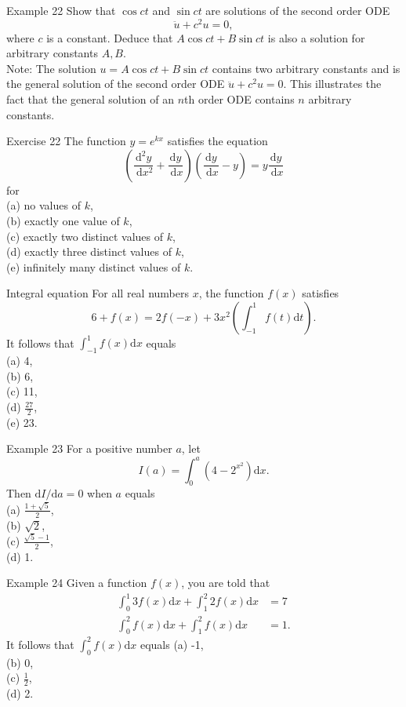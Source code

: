 \documentclass{beamer}
\begin{document}
\begin{frame}{Example 22}
Show that $\cos c t$ and $\sin c t$ are solutions of the second order ODE
$$
\ddot{u}+c^2 u=0,
$$
where $c$ is a constant.
Deduce that $A \cos c t+B \sin c t$ is also a solution for arbitrary constants $A, B$.\\
Note: The solution $u=A \cos c t+B \sin c t$ contains two arbitrary constants and is the general solution of the second order ODE $\ddot{u}+c^2 u=0$. This illustrates the fact that the general solution of an $n$th order ODE contains $n$ arbitrary constants.
\end{frame}

\begin{frame}{Exercise 22}
The function $y=e^{k x}$ satisfies the equation
$$
\left(\frac{\mathrm{d}^2 y}{\mathrm{~d} x^2}+\frac{\mathrm{d} y}{\mathrm{~d} x}\right)\left(\frac{\mathrm{d} y}{\mathrm{~d} x}-y\right)=y \frac{\mathrm{d} y}{\mathrm{~d} x}
$$
for\\
(a) no values of $k$,\\
(b) exactly one value of $k$,\\
(c) exactly two distinct values of $k$,\\
(d) exactly three distinct values of $k$,\\
(e) infinitely many distinct values of $k$.
\end{frame}

\begin{frame}{Integral equation}
For all real numbers $x$, the function $f(x)$ satisfies
$$
6+f(x)=2 f(-x)+3 x^2\left(\int_{-1}^1 f(t) \mathrm{d} t\right) .
$$
It follows that $\int_{-1}^1 f(x) \mathrm{d} x$ equals\\
(a) 4,\\
(b) 6,\\
(c) 11,\\
(d) $\frac{27}{2}$,\\
(e) 23. 
\end{frame}

\begin{frame}{Example 23}
For a positive number $a$, let
$$
I(a)=\int_0^a\left(4-2^{x^2}\right) \mathrm{d} x .
$$
Then $\mathrm{d} I / \mathrm{d} a=0$ when $a$ equals\\
(a) $\frac{1+\sqrt{5}}{2}$,\\
(b) $\sqrt{2}$,\\
(c) $\frac{\sqrt{5}-1}{2}$,\\
(d) 1.
\end{frame}

\begin{frame}{Example 24}
Given a function $f(x)$, you are told that
$$
\begin{aligned}
\int_0^1 3 f(x) \mathrm{d} x+\int_1^2 2 f(x) \mathrm{d} x & =7 \\
\int_0^2 f(x) \mathrm{d} x+\int_1^2 f(x) \mathrm{d} x & =1 .
\end{aligned}
$$
It follows that $\int_0^2 f(x) \mathrm{d} x$ equals
(a) -1,\\
(b) 0,\\
(c) $\frac{1}{2}$,\\
(d) 2.
\end{frame}


\backmatter
\end{document}
